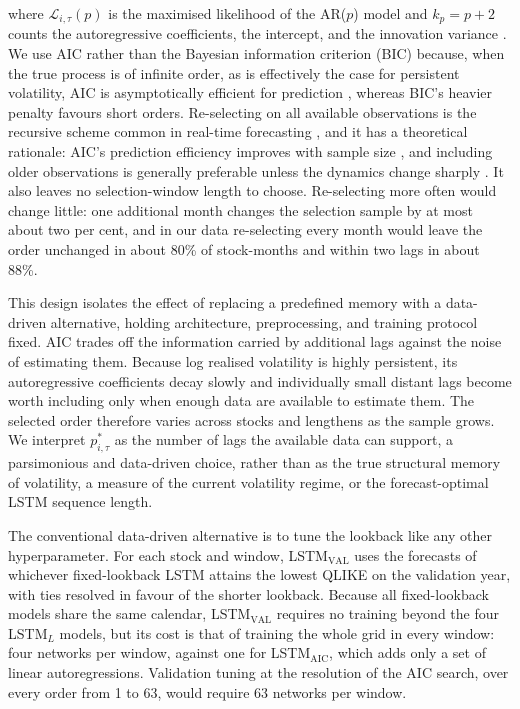 \documentclass[12pt]{article}
\begin{document}
where $\mathcal{L}_{i,\tau}(p)$ is the maximised likelihood of the AR($p$) model and $k_p=p+2$ counts the autoregressive coefficients, the intercept, and the innovation variance \parencite{akaike-1974}. We use AIC rather than the Bayesian information criterion (BIC) because, when the true process is of infinite order, as is effectively the case for persistent volatility, AIC is asymptotically efficient for prediction \parencite{shibata-1980}, whereas BIC's heavier penalty favours short orders. Re-selecting on all available observations is the recursive scheme common in real-time forecasting \parencite{pesaran-1995}, and it has a theoretical rationale: AIC's prediction efficiency improves with sample size \parencite{shibata-1980,ing-2005}, and including older observations is generally preferable unless the dynamics change sharply \parencite{pesaran-2007}. It also leaves no selection-window length to choose. Re-selecting more often would change little: one additional month changes the selection sample by at most about two per cent, and in our data re-selecting every month would leave the order unchanged in about 80\% of stock-months and within two lags in about 88\%.

This design isolates the effect of replacing a predefined memory with a data-driven alternative, holding architecture, preprocessing, and training protocol fixed. AIC trades off the information carried by additional lags against the noise of estimating them. Because log realised volatility is highly persistent, its autoregressive coefficients decay slowly and individually small distant lags become worth including only when enough data are available to estimate them. The selected order therefore varies across stocks and lengthens as the sample grows. We interpret $p_{i,\tau}^{*}$ as the number of lags the available data can support, a parsimonious and data-driven choice, rather than as the true structural memory of volatility, a measure of the current volatility regime, or the forecast-optimal LSTM sequence length.

The conventional data-driven alternative is to tune the lookback like any other hyperparameter. For each stock and window, LSTM$_{\mathrm{VAL}}$ uses the forecasts of whichever fixed-lookback LSTM attains the lowest QLIKE on the validation year, with ties resolved in favour of the shorter lookback. Because all fixed-lookback models share the same calendar, LSTM$_{\mathrm{VAL}}$ requires no training beyond the four LSTM$_{L}$ models, but its cost is that of training the whole grid in every window: four networks per window, against one for LSTM$_{\mathrm{AIC}}$, which adds only a set of linear autoregressions. Validation tuning at the resolution of the AIC search, over every order from 1 to 63, would require 63 networks per window.
\end{document}

